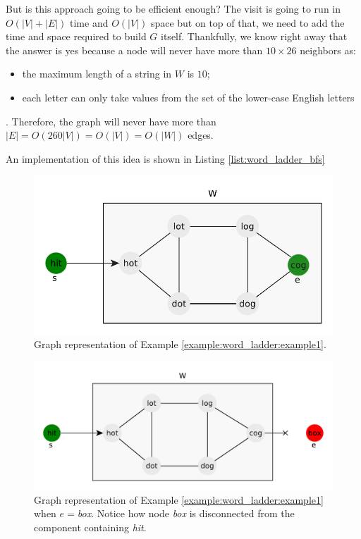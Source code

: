 But is this approach going to be efficient enough? The visit is going to run in $O(|V|+|E|)$ time and $O(|V|)$ space but on top of that, we need to add the time and space required to build $G$ itself. 
Thankfully, we know right away that the answer is yes because a node will never have more than $10\times 26$ neighbors as:
\begin{itemize}
    \item the maximum length of a string in $W$ is $10$;
    \item each letter can only take values from the set of the lower-case English letters
\end{itemize}.
Therefore, the graph will never have more than $|E|=O(260|V|)=O(|V|)=O(|W|)$ edges.

An implementation of this idea is shown in Listing \ref{list:word_ladder_bfs}

    \begin{figure}[]
        \centering
        \includegraphics[width=\textwidth]{sources/word_ladder/images/example1}
        \caption[n]{Graph representation of Example \ref{example:word_ladder:example1}.}
        \label{fig:word_ladder:example1}
    \end{figure}
    \begin{figure}[]
        \centering
        \includegraphics[width=\textwidth]{sources/word_ladder/images/example2}
        \caption[n]{Graph representation of Example \ref{example:word_ladder:example1} when $e=$\textit{box}. Notice how node \textit{box} is disconnected from the component containing \textit{hit}.}
        \label{fig:word_ladder:example1_impossible}
    \end{figure}
    

